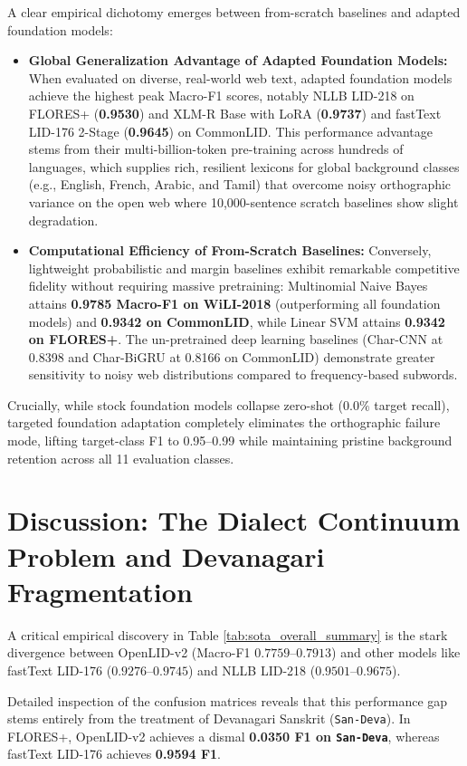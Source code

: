 \documentclass[11pt]{article}
\begin{document}
A clear empirical dichotomy emerges between from-scratch baselines and adapted foundation models:
\begin{itemize}
    \item \textbf{Global Generalization Advantage of Adapted Foundation Models:} When evaluated on diverse, real-world web text, adapted foundation models achieve the highest peak Macro-F1 scores, notably NLLB LID-218 on FLORES+ (\textbf{0.9530}) and XLM-R Base with LoRA (\textbf{0.9737}) and fastText LID-176 2-Stage (\textbf{0.9645}) on CommonLID. This performance advantage stems from their multi-billion-token pre-training across hundreds of languages, which supplies rich, resilient lexicons for global background classes (e.g., English, French, Arabic, and Tamil) that overcome noisy orthographic variance on the open web where 10,000-sentence scratch baselines show slight degradation.
    \item \textbf{Computational Efficiency of From-Scratch Baselines:} Conversely, lightweight probabilistic and margin baselines exhibit remarkable competitive fidelity without requiring massive pretraining: Multinomial Naive Bayes attains \textbf{0.9785 Macro-F1 on WiLI-2018} (outperforming all foundation models) and \textbf{0.9342 on CommonLID}, while Linear SVM attains \textbf{0.9342 on FLORES+}. The un-pretrained deep learning baselines (Char-CNN at 0.8398 and Char-BiGRU at 0.8166 on CommonLID) demonstrate greater sensitivity to noisy web distributions compared to frequency-based subwords.
\end{itemize}

Crucially, while stock foundation models collapse zero-shot ($0.0\%$ target recall), targeted foundation adaptation completely eliminates the orthographic failure mode, lifting target-class F1 to 0.95--0.99 while maintaining pristine background retention across all 11 evaluation classes.

\FloatBarrier
\section{Discussion: The Dialect Continuum Problem and Devanagari Fragmentation}

A critical empirical discovery in Table \ref{tab:sota_overall_summary} is the stark divergence between OpenLID-v2 (Macro-F1 $0.7759$--$0.7913$) and other models like fastText LID-176 ($0.9276$--$0.9745$) and NLLB LID-218 ($0.9501$--$0.9675$).

Detailed inspection of the confusion matrices reveals that this performance gap stems entirely from the treatment of Devanagari Sanskrit (\texttt{San-Deva}). In FLORES+, OpenLID-v2 achieves a dismal \textbf{0.0350 F1 on \texttt{San-Deva}}, whereas fastText LID-176 achieves \textbf{0.9594 F1}.
\end{document}
